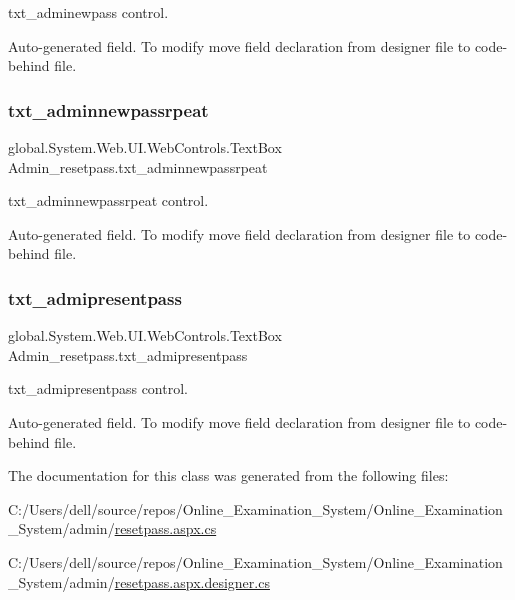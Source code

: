 txt\+\_\+adminewpass control. 

Auto-\/generated field. To modify move field declaration from designer file to code-\/behind file. \mbox{\label{class_admin__resetpass_a3b446dc3ec8e3c4c0847b1112a454e12}} 
\subsubsection{\texorpdfstring{txt\_adminnewpassrpeat}{txt\_adminnewpassrpeat}}
{\footnotesize\ttfamily global.\+System.\+Web.\+U\+I.\+Web\+Controls.\+Text\+Box Admin\+\_\+resetpass.\+txt\+\_\+adminnewpassrpeat\hspace{0.3cm}{\ttfamily [protected]}}



txt\+\_\+adminnewpassrpeat control. 

Auto-\/generated field. To modify move field declaration from designer file to code-\/behind file. \mbox{\label{class_admin__resetpass_a91f1eb852711d555c6744e52684aeb46}} 
\subsubsection{\texorpdfstring{txt\_admipresentpass}{txt\_admipresentpass}}
{\footnotesize\ttfamily global.\+System.\+Web.\+U\+I.\+Web\+Controls.\+Text\+Box Admin\+\_\+resetpass.\+txt\+\_\+admipresentpass\hspace{0.3cm}{\ttfamily [protected]}}



txt\+\_\+admipresentpass control. 

Auto-\/generated field. To modify move field declaration from designer file to code-\/behind file. 

The documentation for this class was generated from the following files\+:\begin{DoxyCompactItemize}
\item 
C\+:/\+Users/dell/source/repos/\+Online\+\_\+\+Examination\+\_\+\+System/\+Online\+\_\+\+Examination\+\_\+\+System/admin/\mbox{\hyperlink{resetpass_8aspx_8cs}{resetpass.\+aspx.\+cs}}\item 
C\+:/\+Users/dell/source/repos/\+Online\+\_\+\+Examination\+\_\+\+System/\+Online\+\_\+\+Examination\+\_\+\+System/admin/\mbox{\hyperlink{resetpass_8aspx_8designer_8cs}{resetpass.\+aspx.\+designer.\+cs}}\end{DoxyCompactItemize}
